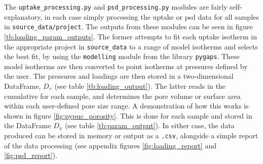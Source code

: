 The \verb|uptake_processing.py| and \verb|psd_processing.py| modules are fairly self-explanatory, in each case simply processing the uptake or \acrshort{psd} data for all samples in \verb|source_data/project|. The outputs from these modules can be seen in figure \ref{tb:loading_param_outputs}. The former attempts to fit each uptake isotherm in the appropriate project in \verb|source_data| to a range of model isotherms and selects the best fit, by using the \verb|modelling| module from the library \verb|pygaps|.\citep{Iacomi2019pyGAPS} These model isotherms are then converted to point isotherms at pressures defined by the user. The pressures and loadings are then stored in a two-dimensional DataFrame, $D_\upsilon$ (see table \ref{tb:loading_output}). The latter reads in the cumulative  for each sample, and determines the pore volume or surface area within each user-defined pore size range. A demonstration of how this works is shown in figure \ref{fig:pypuc_porosity}. This is done for each sample and stored in the DataFrame $D_\pi$ (see table \ref{tb:param_output}). In either case, the data produced can be stored in memory or output as a \verb|.csv|, alongside a simple report of the data processing (see appendix figures \ref{fig:loading_report} and \ref{fig:psd_report}).

